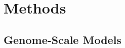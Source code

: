 \section{Methods}\label{sec:methods}

\subsection{Genome-Scale Models}\label{ssec:genome_scale_models}


